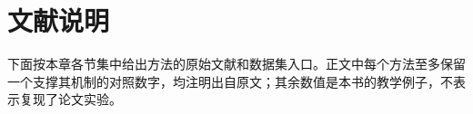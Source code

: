






\section*{文献说明}
\label{sec:nlp-generation-literature}

下面按本章各节集中给出方法的原始文献和数据集入口。正文中每个方法至多保留一个支撑其机制的对照数字，均注明出自原文；其余数值是本书的教学例子，不表示复现了论文实验。

